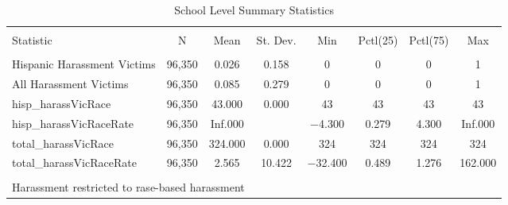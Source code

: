 
\begin{table}[!htbp] \centering 
  \caption{School Level Summary Statistics} 
  \label{} 
\begin{tabular}{@{\extracolsep{5pt}}lccccccc} 
\\[-1.8ex]\hline 
\hline \\[-1.8ex] 
Statistic & \multicolumn{1}{c}{N} & \multicolumn{1}{c}{Mean} & \multicolumn{1}{c}{St. Dev.} & \multicolumn{1}{c}{Min} & \multicolumn{1}{c}{Pctl(25)} & \multicolumn{1}{c}{Pctl(75)} & \multicolumn{1}{c}{Max} \\ 
\hline \\[-1.8ex] 
Hispanic Harassment Victims & 96,350 & 0.026 & 0.158 & 0 & 0 & 0 & 1 \\ 
All Harassment Victims & 96,350 & 0.085 & 0.279 & 0 & 0 & 0 & 1 \\ 
hisp\_harassVicRace & 96,350 & 43.000 & 0.000 & 43 & 43 & 43 & 43 \\ 
hisp\_harassVicRaceRate & 96,350 & Inf.000 &  & $-$4.300 & 0.279 & 4.300 & Inf.000 \\ 
total\_harassVicRace & 96,350 & 324.000 & 0.000 & 324 & 324 & 324 & 324 \\ 
total\_harassVicRaceRate & 96,350 & 2.565 & 10.422 & $-$32.400 & 0.489 & 1.276 & 162.000 \\ 
\hline \\[-1.8ex] 
\multicolumn{8}{l}{Harassment restricted to rase-based harassment} \\ 
\end{tabular} 
\end{table} 
